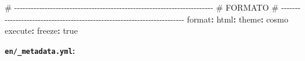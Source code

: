 \documentclass[
  doc,
  floatsintext,
  longtable,
  a4paper,
  nolmodern,
  notxfonts,
  notimes,
  12pt,
  colorlinks=true,linkcolor=blue,citecolor=blue,urlcolor=blue]{apa7}
\newenvironment{Shaded}{\begin{snugshade}}{\end{snugshade}}
\newcommand{\AttributeTok}[1]{\textcolor[rgb]{0.40,0.45,0.13}{#1}}
\newcommand{\CharTok}[1]{\textcolor[rgb]{0.13,0.47,0.30}{#1}}
\newcommand{\CommentTok}[1]{\textcolor[rgb]{0.37,0.37,0.37}{#1}}
\newcommand{\FunctionTok}[1]{\textcolor[rgb]{0.28,0.35,0.67}{#1}}
\newcommand{\KeywordTok}[1]{\textcolor[rgb]{0.00,0.23,0.31}{\textbf{#1}}}
\begin{document}
\begin{Shaded}
\begin{Highlighting}[]
\CommentTok{\# {-}{-}{-}{-}{-}{-}{-}{-}{-}{-}{-}{-}{-}{-}{-}{-}{-}{-}{-}{-}{-}{-}{-}{-}{-}{-}{-}{-}{-}{-}{-}{-}{-}{-}{-}{-}{-}{-}{-}{-}{-}{-}{-}{-}{-}{-}{-}{-}{-}{-}{-}{-}{-}{-}{-}{-}{-}{-}{-}{-}{-}{-}{-}{-}{-}{-}{-}{-}{-}{-}{-}{-}}
\CommentTok{\# FORMATO}
\CommentTok{\# {-}{-}{-}{-}{-}{-}{-}{-}{-}{-}{-}{-}{-}{-}{-}{-}{-}{-}{-}{-}{-}{-}{-}{-}{-}{-}{-}{-}{-}{-}{-}{-}{-}{-}{-}{-}{-}{-}{-}{-}{-}{-}{-}{-}{-}{-}{-}{-}{-}{-}{-}{-}{-}{-}{-}{-}{-}{-}{-}{-}{-}{-}{-}{-}{-}{-}{-}{-}{-}{-}{-}{-}}
\FunctionTok{format}\KeywordTok{:}
\AttributeTok{  }\FunctionTok{html}\KeywordTok{:}
\AttributeTok{    }\FunctionTok{theme}\KeywordTok{:}\AttributeTok{ cosmo}
\AttributeTok{    }
\FunctionTok{execute}\KeywordTok{:}
\AttributeTok{  }\FunctionTok{freeze}\KeywordTok{:}\AttributeTok{ }\CharTok{true}
\end{Highlighting}
\end{Shaded}

\textbf{\texttt{en/\_metadata.yml}:}
\end{document}
